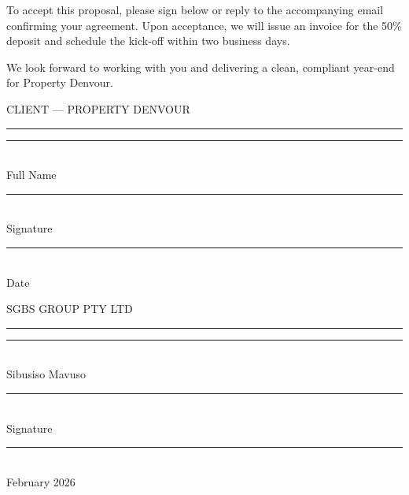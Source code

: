 \documentclass[a4paper,11pt]{article}
\begin{document}
\vspace{8pt}
{\color{textbody}\fontsize{10.5pt}{16pt}\selectfont
To accept this proposal, please sign below or reply to the accompanying email confirming your agreement. Upon acceptance, we will issue an invoice for the 50\% deposit and schedule the kick-off within two business days.

We look forward to working with you and delivering a clean, compliant year-end for Property Denvour.}

\vspace{24pt}
\begin{minipage}[t]{0.46\textwidth}
\begin{tcolorbox}[colback=graybg!40, colframe=grayline, boxrule=0.5pt, arc=3pt, left=5mm, right=5mm, top=5mm, bottom=5mm]
{\color{navy}\latosemibold\fontsize{8.5pt}{8.5pt}\selectfont{}CLIENT --- PROPERTY DENVOUR}\\[2pt]
\textcolor{gold}{\rule{\linewidth}{1.5pt}}

\vspace{30pt}
\textcolor{grayline}{\rule{\linewidth}{0.5pt}}\\[2pt]
{\color{textlight}\latolight\fontsize{7.5pt}{7.5pt}\selectfont Full Name}

\vspace{30pt}
\textcolor{grayline}{\rule{\linewidth}{0.5pt}}\\[2pt]
{\color{textlight}\latolight\fontsize{7.5pt}{7.5pt}\selectfont Signature}

\vspace{30pt}
\textcolor{grayline}{\rule{\linewidth}{0.5pt}}\\[2pt]
{\color{textlight}\latolight\fontsize{7.5pt}{7.5pt}\selectfont Date}
\end{tcolorbox}
\end{minipage}%
\hfill
\begin{minipage}[t]{0.46\textwidth}
\begin{tcolorbox}[colback=graybg!40, colframe=grayline, boxrule=0.5pt, arc=3pt, left=5mm, right=5mm, top=5mm, bottom=5mm]
{\color{navy}\latosemibold\fontsize{8.5pt}{8.5pt}\selectfont{}SGBS GROUP PTY LTD}\\[2pt]
\textcolor{gold}{\rule{\linewidth}{1.5pt}}

\vspace{30pt}
\textcolor{grayline}{\rule{\linewidth}{0.5pt}}\\[2pt]
{\color{textlight}\latolight\fontsize{7.5pt}{7.5pt}\selectfont Sibusiso Mavuso}

\vspace{30pt}
\textcolor{grayline}{\rule{\linewidth}{0.5pt}}\\[2pt]
{\color{textlight}\latolight\fontsize{7.5pt}{7.5pt}\selectfont Signature}

\vspace{30pt}
\textcolor{grayline}{\rule{\linewidth}{0.5pt}}\\[2pt]
{\color{textlight}\latolight\fontsize{7.5pt}{7.5pt} February 2026}
\end{tcolorbox}
\end{minipage}
\end{document}
